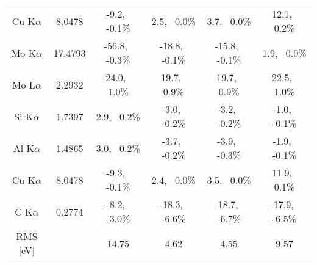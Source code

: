 \begin{table}[p]
\begin{tabular}{cccccc}
        Cu K$\alpha$ & 8.0478      & -9.2,\,\,\,   -0.1\%  & 2.5,\,\,\,    0.0\%   & 3.7,\,\,\,    0.0\%          & 12.1,\,\,\,    0.2\%         \\
        Mo K$\alpha$ & 17.4793     & -56.8,\,\,\,   -0.3\% & -18.8,\,\,\,   -0.1\% & -15.8,\,\,\,   -0.1\%        & 1.9,\,\,\,    0.0\%          \\
        Mo L$\alpha$ & 2.2932      & 24.0,\,\,\,    1.0\%  & 19.7,\,\,\,    0.9\%  & 19.7,\,\,\,    0.9\%         & 22.5,\,\,\,    1.0\%         \\
        Si K$\alpha$ & 1.7397      & 2.9,\,\,\,    0.2\%   & -3.0,\,\,\,   -0.2\%  & -3.2,\,\,\,   -0.2\%         & -1.0,\,\,\,   -0.1\%         \\
        Al K$\alpha$ & 1.4865      & 3.0,\,\,\,    0.2\%   & -3.7,\,\,\,   -0.2\%  & -3.9,\,\,\,   -0.3\%         & -1.9,\,\,\,   -0.1\%         \\
        Cu K$\alpha$ & 8.0478      & -9.3,\,\,\,   -0.1\%  & 2.4,\,\,\,    0.0\%   & 3.5,\,\,\,    0.0\%          & 11.9,\,\,\,    0.1\%         \\
        C K$\alpha$  & 0.2774      & -8.2,\,\,\,   -3.0\%  & -18.3,\,\,\,   -6.6\% & -18.7,\,\,\,   -6.7\%        & -17.9,\,\,\,   -6.5\%        \\
        \hline
        RMS  [eV]    &             & 14.75                 & 4.62                  & 4.55                         & 9.57
    \end{tabular}
\end{table}